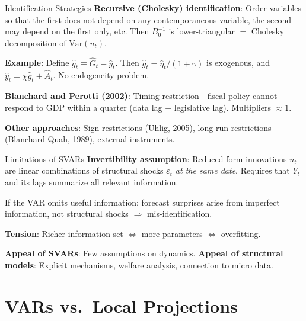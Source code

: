 \documentclass[blue]{beamer}
\begin{document}
\begin{frame}{Identification Strategies}
	\textbf{Recursive (Cholesky) identification}: Order variables so that the first does not depend on any contemporaneous variable, the second may depend on the first only, etc. Then $B_0^{-1}$ is lower-triangular $=$ Cholesky decomposition of $\text{Var}(u_t)$.
	
	\bigskip
	\textbf{Example}: Define $\hat{g}_t \equiv \hat{G}_t - \hat{y}_t$. Then $\hat{g}_t = \hat{\eta}_t/(1+\gamma)$ is exogenous, and $\hat{y}_t = \chi \hat{g}_t + \hat{A}_t$. No endogeneity problem.
	
	\bigskip
	\textbf{Blanchard and Perotti (2002)}: Timing restriction---fiscal policy cannot respond to GDP within a quarter (data lag + legislative lag). Multipliers $\approx 1$.
	
	\bigskip
	\textbf{Other approaches}: Sign restrictions (Uhlig, 2005), long-run restrictions (Blanchard-Quah, 1989), external instruments.
\end{frame}

\begin{frame}{Limitations of SVARs}
	\textbf{Invertibility assumption}: Reduced-form innovations $u_t$ are linear combinations of structural shocks $\varepsilon_t$ \emph{at the same date}. Requires that $Y_t$ and its lags summarize all relevant information.
	
	\bigskip
	If the VAR omits useful information: forecast surprises arise from imperfect information, not structural shocks $\Rightarrow$ mis-identification.
	
	\bigskip
	\textbf{Tension}: Richer information set $\Leftrightarrow$ more parameters $\Leftrightarrow$ overfitting.
	
	\bigskip
	\textbf{Appeal of SVARs}: Few assumptions on dynamics. \textbf{Appeal of structural models}: Explicit mechanisms, welfare analysis, connection to micro data.
\end{frame}

\section{VARs vs.\ Local Projections}
\end{document}
